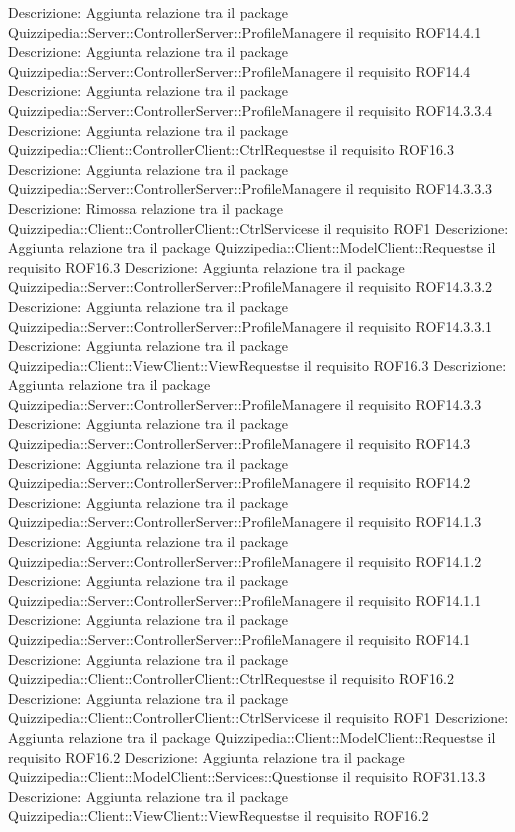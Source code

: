 Descrizione: Aggiunta relazione tra il package Quizzipedia::Server::ControllerServer::ProfileManagere il requisito ROF14.4.1 
Descrizione: Aggiunta relazione tra il package Quizzipedia::Server::ControllerServer::ProfileManagere il requisito ROF14.4 
Descrizione: Aggiunta relazione tra il package Quizzipedia::Server::ControllerServer::ProfileManagere il requisito ROF14.3.3.4 
Descrizione: Aggiunta relazione tra il package Quizzipedia::Client::ControllerClient::CtrlRequestse il requisito ROF16.3 
Descrizione: Aggiunta relazione tra il package Quizzipedia::Server::ControllerServer::ProfileManagere il requisito ROF14.3.3.3 
Descrizione: Rimossa relazione tra il package Quizzipedia::Client::ControllerClient::CtrlServicese il requisito ROF1 
Descrizione: Aggiunta relazione tra il package Quizzipedia::Client::ModelClient::Requestse il requisito ROF16.3 
Descrizione: Aggiunta relazione tra il package Quizzipedia::Server::ControllerServer::ProfileManagere il requisito ROF14.3.3.2 
Descrizione: Aggiunta relazione tra il package Quizzipedia::Server::ControllerServer::ProfileManagere il requisito ROF14.3.3.1 
Descrizione: Aggiunta relazione tra il package Quizzipedia::Client::ViewClient::ViewRequestse il requisito ROF16.3 
Descrizione: Aggiunta relazione tra il package Quizzipedia::Server::ControllerServer::ProfileManagere il requisito ROF14.3.3 
Descrizione: Aggiunta relazione tra il package Quizzipedia::Server::ControllerServer::ProfileManagere il requisito ROF14.3 
Descrizione: Aggiunta relazione tra il package Quizzipedia::Server::ControllerServer::ProfileManagere il requisito ROF14.2 
Descrizione: Aggiunta relazione tra il package Quizzipedia::Server::ControllerServer::ProfileManagere il requisito ROF14.1.3 
Descrizione: Aggiunta relazione tra il package Quizzipedia::Server::ControllerServer::ProfileManagere il requisito ROF14.1.2 
Descrizione: Aggiunta relazione tra il package Quizzipedia::Server::ControllerServer::ProfileManagere il requisito ROF14.1.1 
Descrizione: Aggiunta relazione tra il package Quizzipedia::Server::ControllerServer::ProfileManagere il requisito ROF14.1 
Descrizione: Aggiunta relazione tra il package Quizzipedia::Client::ControllerClient::CtrlRequestse il requisito ROF16.2 
Descrizione: Aggiunta relazione tra il package Quizzipedia::Client::ControllerClient::CtrlServicese il requisito ROF1 
Descrizione: Aggiunta relazione tra il package Quizzipedia::Client::ModelClient::Requestse il requisito ROF16.2 
Descrizione: Aggiunta relazione tra il package Quizzipedia::Client::ModelClient::Services::Questionse il requisito ROF31.13.3 
Descrizione: Aggiunta relazione tra il package Quizzipedia::Client::ViewClient::ViewRequestse il requisito ROF16.2 
